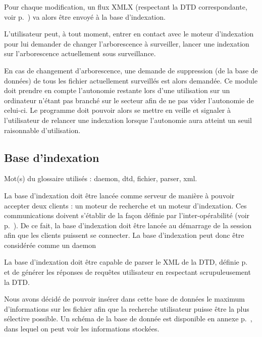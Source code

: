 \documentclass[a4paper,12pt]{report}
\begin{document}
Pour chaque modification, un flux XMLX (respectant la DTD correspondante, voir p.~\pageref{dtd_bi_mi}) va alors être envoyé à la base d'indexation.

L'utilisateur peut, à tout moment, entrer en contact avec le moteur d'indexation pour lui demander de changer l'arborescence à surveiller, lancer une indexation sur l'arborescence actuellement sous surveillance.

En cas de changement d'arborescence, une demande de suppression (de la base de données) de tous les fichier actuellement surveillés est alors demandée.
Ce module doit prendre en compte l'autonomie restante lors d'une utilisation sur un ordinateur n'étant pas branché sur le secteur afin de ne pas vider l'autonomie de celui-ci. Le programme doit pouvoir alors se mettre en veille et signaler à l'utilisateur de relancer une indexation lorsque l'autonomie aura atteint un seuil raisonnable d'utilisation.

\subsection{Base d'indexation}
Mot(s) du glossaire utilisés : \gls{daemon}, \gls{dtd}, \gls{fichier}, \gls{parser}, \gls{xml}.

La base d'indexation doit être lancée comme serveur de manière à pouvoir accepter deux clients : un moteur de recherche et un moteur d'indexation. Ces communications doivent s'établir de la façon définie par l'inter-opérabilité (voir p.~\pageref{inter_operabilite}). De ce fait, la base d'indexation doit être lancée au démarrage de la session afin que les clients puissent se connecter. La base d'indexation peut donc être considérée comme un daemon

La base d'indexation doit être capable de parser le XML de la DTD, définie p.~\pageref{dtd} et de générer les réponses de requêtes utilisateur en respectant scrupuleusement la DTD.

Nous avons décidé de pouvoir insérer dans cette base de données le maximum d'informations sur les fichier afin que la recherche utilisateur puisse être la plus sélective possible. Un schéma de la base de donnée est disponible en annexe p.~\pageref{bdd}, dans lequel on peut voir les informations stockées.
\end{document}
